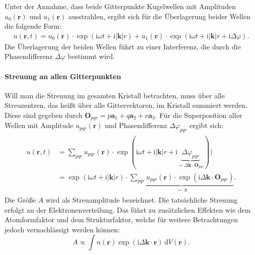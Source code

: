 Unter der Annahme, dass beide Gitterpunkte Kugelwellen mit Amplituden $u_{0}(\mathbf{r})$ und $u_{1}(\mathbf{r})$
ausstrahlen, ergibt sich für die Überlagerung beider Wellen die folgende Form:
\begin{align}
    u(\mathbf{r},t)=u_{0}(\mathbf{r})\cdot \exp(\mathrm{i}\omega t+\mathrm{i}\lvert \mathbf{k}
    \rvert r) + u_{1}(\mathbf{r}) \cdot \exp(\mathrm{i}\omega t + \mathrm{i}\lvert \mathbf{k}
    \rvert r+\mathrm{i}\Delta\varphi).
\end{align}
Die Überlagerung der beiden Wellen führt zu einer Interferenz, die durch die Phasendifferenz $\Delta\varphi$ bestimmt
wird.

\paragraph{Streuung an allen Gitterpunkten}
Will man die Streuung im gesamten Kristall betrachten, muss über alle Streuzentren, das heißt über alle Gittervektoren,
im Kristall summiert werden.
Diese sind gegeben durch $\mathbf{O}_{pqr}=p\mathbf{a}_{1}+q\mathbf{a}_{2}+r\mathbf{a}_{3}$.
Für die Superposition aller Wellen mit Amplitude $u_{pqr}(\mathbf{r})$ und Phasendifferenz $\Delta\varphi_{pqr}$
ergibt sich:
\begin{align}
    \begin{split}
        u(\mathbf{r}, t)
        &=\sum_{pqr} u_{pqr}(\mathbf{r})\cdot \exp(\mathrm{i}\omega t+\mathrm{i}
        \lvert \mathbf{k} \rvert r+\mathrm{i}\underbrace{ \Delta\varphi_{pqr} }_{ = \Delta
        \mathbf{k}\cdot \mathbf{O}_{pqr}})) \\
        &=\exp(\mathrm{i}\omega t+\mathrm{i}\lvert \mathbf{k} \rvert r)\cdot
        \underbrace{ \sum_{pqr}u_{pqr}(\mathbf{r})\cdot \exp(\mathrm{i}\Delta \mathbf{k}
        \cdot \mathbf{O}_{pqr}) }_{ \coloneqq A }.
    \end{split}
    \label{eq:amplitude}
\end{align}
Die Größe $A$ wird als Streuamplitude bezeichnet.
Die tatsächliche Streuung erfolgt an der Elektronenverteilung.
Das führt zu zusätzlichen Effekten wie dem Atomformfaktor und dem Strukturfaktor,
welche für weitere Betrachtungen jedoch vernachlässigt werden können:\autocite[66-69]{Spiess}
\begin{equation}
    A \propto \int n(\mathbf{r}) \exp(\mathrm{i} \Delta \mathbf{k}\cdot
    \mathbf{r}) \, \mathrm{d}V(\mathbf{r}).
    \label{eq:atomformfaktor}
\end{equation}

